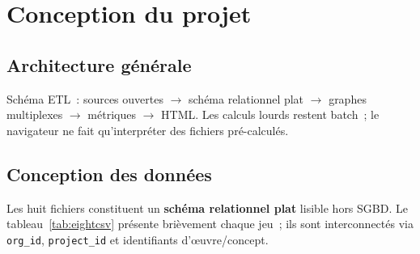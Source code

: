 \documentclass[12pt,a4paper,oneside]{article}
\begin{document}
\section{Conception du projet}

\subsection{Architecture générale}
Schéma ETL~: sources ouvertes $\rightarrow$ schéma relationnel plat $\rightarrow$ graphes multiplexes $\rightarrow$ métriques $\rightarrow$ HTML. Les calculs lourds restent batch~; le navigateur ne fait qu'interpréter des fichiers pré-calculés.

\subsection{Conception des données}
Les huit fichiers constituent un \textbf{schéma relationnel plat} lisible hors SGBD. Le tableau~\ref{tab:eightcsv} présente brièvement chaque jeu~; ils sont interconnectés via \texttt{org\_id}, \texttt{project\_id} et identifiants d'œuvre/concept.
\end{document}
